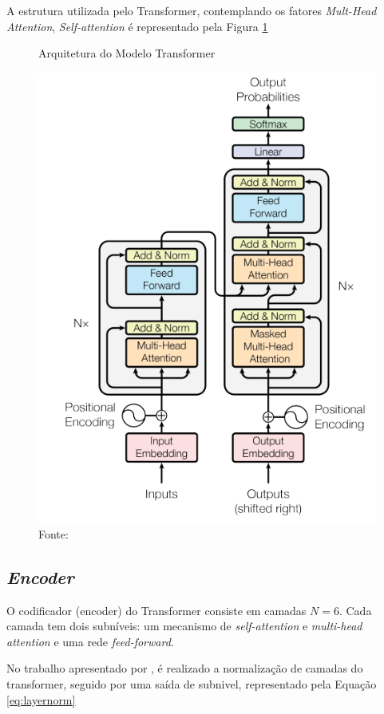 A estrutura utilizada pelo Transformer, contemplando os fatores \textit{Mult-Head Attention}, \textit{Self-attention} é representado pela Figura \ref{fig:transformer1}

\begin{figure}[H]
    \centering
    \caption{Arquitetura do Modelo Transformer}
    \includegraphics[width=\linewidth]{img/transformer1.png}
    \caption*{Fonte: \cite{vaswani2023attentionneed}}
    \label{fig:transformer1}
\end{figure}

\subsection*{\textit{Encoder}}
O codificador (encoder) do Transformer consiste em camadas $N = 6$. Cada camada tem dois subníveis: um mecanismo de \textit{self-attention} e \textit{multi-head attention} e uma rede \textit{feed-forward}.

No trabalho apresentado por \cite{vaswani2023attentionneed}, é realizado a normalização de camadas do transformer, seguido por uma saída de subnivel, representado pela Equação \ref{eq:layernorm}


